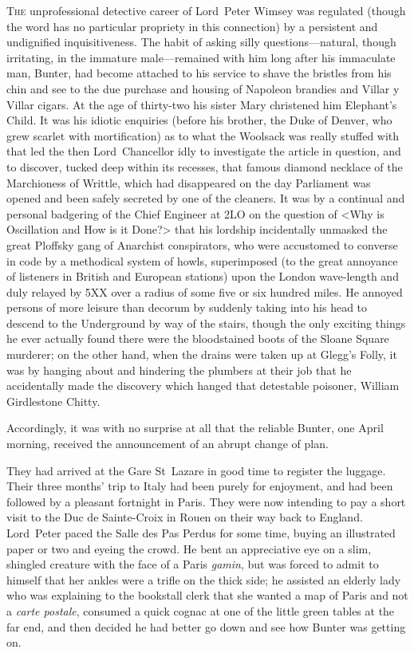 	
\lettrine[lines=4]{T}{he} unprofessional detective career of Lord~Peter Wimsey was regulated (though the word has no particular propriety in this connection) by a persistent and undignified inquisitiveness. The habit of asking silly questions—natural, though irritating, in the immature male—remained with him long after his immaculate man, Bunter, had become attached to his service to shave the bristles from his chin and see to the due purchase and housing of Napoleon brandies and Villar y Villar cigars. At the age of thirty-two his sister Mary christened him Elephant's Child. It was his idiotic enquiries (before his brother, the Duke of Denver, who grew scarlet with mortification) as to what the Woolsack was really stuffed with that led the then Lord~Chancellor idly to investigate the article in question, and to discover, tucked deep within its recesses, that famous diamond necklace of the Marchioness of Writtle, which had disappeared on the day Parliament was opened and been safely secreted by one of the cleaners. It was by a continual and personal badgering of the Chief Engineer at 2LO on the question of <Why is Oscillation and How is it Done?> that his lordship incidentally unmasked the great Ploffsky gang of Anarchist conspirators, who were accustomed to converse in code by a methodical system of howls, superimposed (to the great annoyance of listeners in British and European stations) upon the London wave-length and duly relayed by 5XX over a radius of some five or six hundred miles. He annoyed persons of more leisure than decorum by suddenly taking into his head to descend to the Underground by way of the stairs, though the only exciting things he ever actually found there were the bloodstained boots of the Sloane Square murderer; on the other hand, when the drains were taken up at Glegg's Folly, it was by hanging about and hindering the plumbers at their job that he accidentally made the discovery which hanged that detestable poisoner, William Girdlestone Chitty.

Accordingly, it was with no surprise at all that the reliable Bunter, one April morning, received the announcement of an abrupt change of plan.

They had arrived at the Gare St~Lazare in good time to register the luggage. Their three months' trip to Italy had been purely for enjoyment, and had been followed by a pleasant fortnight in Paris. They were now intending to pay a short visit to the Duc de Sainte-Croix in Rouen on their way back to England. Lord~Peter paced the Salle des Pas Perdus for some time, buying an illustrated paper or two and eyeing the crowd. He bent an appreciative eye on a slim, shingled creature with the face of a Paris \textit{gamin}, but was forced to admit to himself that her ankles were a trifle on the thick side; he assisted an elderly lady who was explaining to the bookstall clerk that she wanted a map of Paris and not a \textit{carte postale}, consumed a quick cognac at one of the little green tables at the far end, and then decided he had better go down and see how Bunter was getting on.

